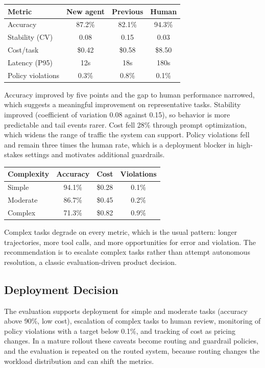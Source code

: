 \documentclass[11pt]{book}
\begin{document}
\begin{center}
\begin{tabular}{lccc}
\toprule
Metric & New agent & Previous & Human \\
\midrule
Accuracy & 87.2\% & 82.1\% & 94.3\% \\
Stability (CV) & 0.08 & 0.15 & 0.03 \\
Cost/task & \$0.42 & \$0.58 & \$8.50 \\
Latency (P95) & 12s & 18s & 180s \\
Policy violations & 0.3\% & 0.8\% & 0.1\% \\
\bottomrule
\end{tabular}
\end{center}

Accuracy improved by five points and the gap to human performance narrowed, which suggests a meaningful improvement on representative tasks. Stability improved (coefficient of variation 0.08 against 0.15), so behavior is more predictable and tail events rarer. Cost fell 28\% through prompt optimization, which widens the range of traffic the system can support. Policy violations fell and remain three times the human rate, which is a deployment blocker in high-stakes settings and motivates additional guardrails.

\begin{center}
\begin{tabular}{lccc}
\toprule
Complexity & Accuracy & Cost & Violations \\
\midrule
Simple & 94.1\% & \$0.28 & 0.1\% \\
Moderate & 86.7\% & \$0.45 & 0.2\% \\
Complex & 71.3\% & \$0.82 & 0.9\% \\
\bottomrule
\end{tabular}
\end{center}

Complex tasks degrade on every metric, which is the usual pattern: longer trajectories, more tool calls, and more opportunities for error and violation. The recommendation is to escalate complex tasks rather than attempt autonomous resolution, a classic evaluation-driven product decision.

\subsection{Deployment Decision}

The evaluation supports deployment for simple and moderate tasks (accuracy above 90\%, low cost), escalation of complex tasks to human review, monitoring of policy violations with a target below 0.1\%, and tracking of cost as pricing changes. In a mature rollout these caveats become routing and guardrail policies, and the evaluation is repeated on the routed system, because routing changes the workload distribution and can shift the metrics.
\end{document}
